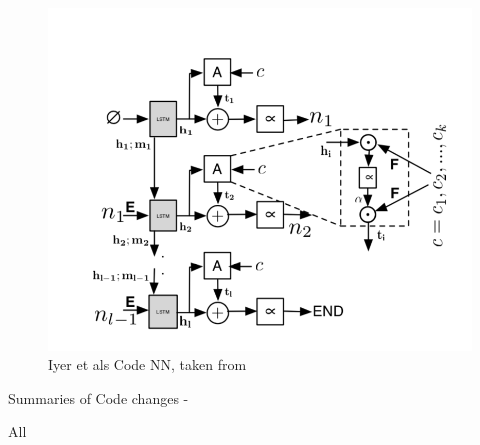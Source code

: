 \begin{figure}[tb]
    \centering
    \includegraphics[width=0.5\linewidth]{ModelPics/Iyer_etal.png}
    \caption{Iyer et als Code NN, taken from \cite{iyer_summarizing_2016}}
    \label{fig:Iyer}
\end{figure}








 Summaries of Code changes - 








All